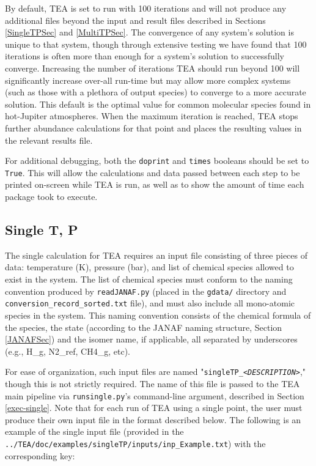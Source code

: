 {By default, TEA is set to run with 100 iterations and will not produce
any additional files beyond the input and result files described in
Sections \ref{SingleTPSec} and \ref{MultiTPSec}.  The convergence of
any system's solution is unique to that system, though through
extensive testing we have found that 100 iterations is often more than
enough for a system's solution to successfully converge.  Increasing
the number of iterations TEA should run beyond 100 will significantly
increase over-all run-time but may allow more complex systems (such as
those with a plethora of output species) to converge to a more
accurate solution.  This default is the optimal value for common
molecular species found in hot-Jupiter atmospheres.  When the maximum
iteration is reached, TEA stops further abundance calculations for
that  point and places the resulting values in the relevant
results file.

For additional debugging, both the \texttt{doprint} and \texttt{times}
booleans should be set to \texttt{True}.  This will allow the calculations
and data passed between each step to be printed on-screen while TEA
is run, as well as to show the amount of time each package took to
execute.

\subsection{Single T, P} 
\label{singleTP}
  The single  calculation for TEA requires an input file
  consisting of three pieces of data: temperature (K), pressure (bar),
  and list of chemical species allowed to exist in the system.  The
  list of chemical species must conform to the naming convention
  produced by \texttt{readJANAF.py} (placed in the \texttt{gdata/}
  directory and \texttt{conversion\_record\_sorted.txt} file), and
  must also include all mono-atomic species in the system. This naming
  convention consists of the chemical formula of the species, the
  state (according to the JANAF naming structure,
  Section \ref{JANAFSec}) and the isomer name, if applicable, all
  separated by underscores (e.g., H\_g, N2\_ref, CH4\_g, etc).
  
  For ease of organization, such input files are named
  "\texttt{singleTP\_\textit{<DESCRIPTION>}}," though this is not
  strictly required.  The name of this file is passed to the TEA main
  pipeline via \newline \texttt{runsingle.py}'s command-line argument,
  described in Section \ref{exec-single}. Note that for each run of
  TEA using a single  point, the user must produce their
  own input file in the format described below.  The following is an
  example of the single  input file (provided in
  the \newline \texttt{../TEA/doc/examples/singleTP/inputs/inp\_Example.txt})
  with the corresponding key:\\
  

}
